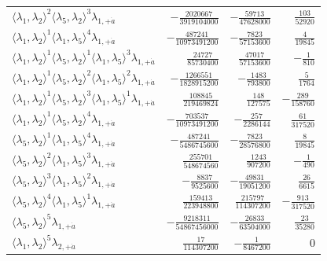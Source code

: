 \begin{longtable}{@{}lrrr@{}}
$\langle\lambda_1,\lambda_2\rangle^{2}\langle\lambda_5,\lambda_2\rangle^{3}\lambda_{1,+\dot a}$ & $-\frac{2020667}{3919104000}$ & $-\frac{59713}{47628000}$ & $\frac{103}{52920}$ \\
$\langle\lambda_1,\lambda_2\rangle^{1}\langle\lambda_1,\lambda_5\rangle^{4}\lambda_{1,+\dot a}$ & $-\frac{487241}{10973491200}$ & $-\frac{7823}{57153600}$ & $\frac{4}{19845}$ \\
$\langle\lambda_1,\lambda_2\rangle^{1}\langle\lambda_5,\lambda_2\rangle^{1}\langle\lambda_1,\lambda_5\rangle^{3}\lambda_{1,+\dot a}$ & $\frac{24727}{85730400}$ & $\frac{47017}{57153600}$ & $-\frac{1}{810}$ \\
$\langle\lambda_1,\lambda_2\rangle^{1}\langle\lambda_5,\lambda_2\rangle^{2}\langle\lambda_1,\lambda_5\rangle^{2}\lambda_{1,+\dot a}$ & $-\frac{1266551}{1828915200}$ & $-\frac{1483}{793800}$ & $\frac{5}{1764}$ \\
$\langle\lambda_1,\lambda_2\rangle^{1}\langle\lambda_5,\lambda_2\rangle^{3}\langle\lambda_1,\lambda_5\rangle^{1}\lambda_{1,+\dot a}$ & $\frac{108845}{219469824}$ & $\frac{148}{127575}$ & $-\frac{289}{158760}$ \\
$\langle\lambda_1,\lambda_2\rangle^{1}\langle\lambda_5,\lambda_2\rangle^{4}\lambda_{1,+\dot a}$ & $-\frac{703537}{10973491200}$ & $-\frac{257}{2286144}$ & $\frac{61}{317520}$ \\
$\langle\lambda_5,\lambda_2\rangle^{1}\langle\lambda_1,\lambda_5\rangle^{4}\lambda_{1,+\dot a}$ & $-\frac{487241}{5486745600}$ & $-\frac{7823}{28576800}$ & $\frac{8}{19845}$ \\
$\langle\lambda_5,\lambda_2\rangle^{2}\langle\lambda_1,\lambda_5\rangle^{3}\lambda_{1,+\dot a}$ & $\frac{255701}{548674560}$ & $\frac{1243}{907200}$ & $-\frac{1}{490}$ \\
$\langle\lambda_5,\lambda_2\rangle^{3}\langle\lambda_1,\lambda_5\rangle^{2}\lambda_{1,+\dot a}$ & $-\frac{8837}{9525600}$ & $-\frac{49831}{19051200}$ & $\frac{26}{6615}$ \\
$\langle\lambda_5,\lambda_2\rangle^{4}\langle\lambda_1,\lambda_5\rangle^{1}\lambda_{1,+\dot a}$ & $\frac{159413}{223948800}$ & $\frac{215797}{114307200}$ & $-\frac{913}{317520}$ \\
$\langle\lambda_5,\lambda_2\rangle^{5}\lambda_{1,+\dot a}$ & $-\frac{9218311}{54867456000}$ & $-\frac{26833}{63504000}$ & $\frac{23}{35280}$ \\
$\langle\lambda_1,\lambda_2\rangle^{5}\lambda_{2,+\dot a}$ & $\frac{17}{114307200}$ & $-\frac{1}{8467200}$ & $0$ \\

\end{longtable}
